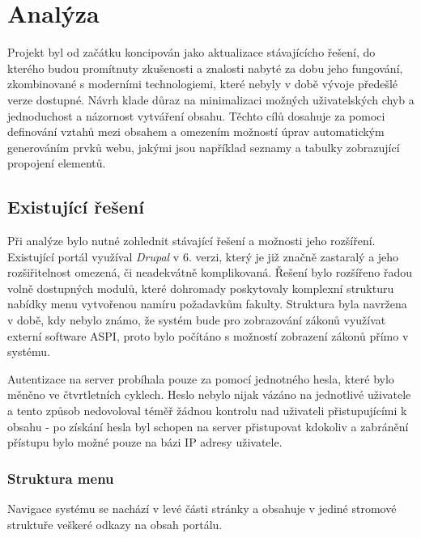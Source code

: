 \chapter{Analýza}
\label{chap:analyza}
Projekt byl od začátku koncipován jako aktualizace stávajícícho řešení, do kterého budou promítnuty zkušenosti a znalosti nabyté za dobu jeho fungování, zkombinované s moderními technologiemi, které nebyly v době vývoje předešlé verze dostupné. Návrh klade důraz na minimalizaci možných uživatelských chyb a jednoduchost a názornost vytváření obsahu. Těchto cílů dosahuje za pomoci definování vztahů mezi obsahem a omezením možností úprav automatickým generováním prvků webu, jakými jsou například seznamy a tabulky zobrazující propojení elementů.

\section{Existující řešení}
Při analýze bylo nutné zohlednit stávající řešení a možnosti jeho rozšíření. Existující portál využíval \emph{Drupal} v 6. verzi, který je již značně zastaralý a jeho rozšiřitelnost omezená, či neadekvátně komplikovaná. Řešení bylo rozšířeno řadou volně dostupných modulů, které dohromady poskytovaly komplexní strukturu nabídky menu vytvořenou namíru požadavkům fakulty. Struktura byla navržena v době, kdy nebylo známo, že systém bude pro zobrazování zákonů využívat externí software ASPI, proto bylo počítáno s možností zobrazení zákonů přímo v systému. 

Autentizace na server probíhala pouze za pomocí jednotného hesla, které bylo měněno ve čtvrtletních cyklech. Heslo nebylo nijak vázáno na jednotlivé uživatele a tento způsob nedovoloval téměř žádnou kontrolu nad uživateli přistupujícími k obsahu - po získání hesla byl schopen na server přistupovat kdokoliv a zabránění přístupu bylo možné pouze na bázi IP adresy uživatele. 

\subsection*{Struktura menu}

Navigace systému se nachází v levé části stránky a obsahuje v jediné stromové struktuře veškeré odkazy na obsah portálu.

